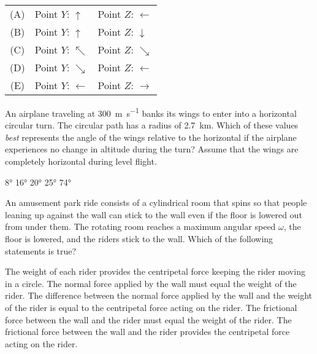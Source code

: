 \documentclass{../../oss-apphys-exam}
\begin{document}
\begin{multicols*}{2}
\begin{questions}
    \begin{tabular}{cll}
      (A) & Point $Y$: {\LARGE $\uparrow$} & Point $Z$: {\LARGE $\leftarrow$}\\
      (B) & Point $Y$: {\LARGE $\uparrow$} & Point $Z$: {\LARGE $\downarrow$}\\
      (C) & Point $Y$: {\LARGE $\nwarrow$} & Point $Z$: {\LARGE $\searrow$}\\
      (D) & Point $Y$: {\LARGE $\searrow$} & Point $Z$: {\LARGE $\leftarrow$}\\
      (E) & Point $Y$: {\LARGE $\leftarrow$}&Point $Z$: {\LARGE $\rightarrow$}\\
    \end{tabular}
    \columnbreak

    \columnbreak
    
    \question An airplane traveling at \SI{300}{\metre\per\second} banks its
    wings to enter into a horizontal circular turn. The circular path has a
    radius of \SI{2.7}{\kilo\metre}. Which of these values \emph{best}
    represents the angle of the wings relative to the horizontal if the airplane
    experiences no change in altitude during the turn? Assume that the wings
    are completely horizontal during level flight.
    \begin{choices}
      \choice\ang{8}
      \choice\ang{16}
      \choice\ang{20}
      \choice\ang{25}
      \correctchoice\ang{74}
    \end{choices}
    
    
    \question An amusement park ride consists of a cylindrical room that spins
    so that people leaning up against the wall can stick to the wall even if the
    floor is lowered out from under them. The rotating room reaches a maximum
    angular speed $\omega$, the floor is lowered, and the riders stick to
    the wall. Which of the following statements is true?
    \begin{choices}
      \choice The weight of each rider provides the centripetal force keeping
      the rider moving in a circle.
      \choice The normal force applied by the wall must equal the weight of the
      rider.
      \choice The difference between the normal force applied by the wall and
      the weight of the rider is equal to the centripetal force acting on the
      rider.
      \choice The frictional force between the wall and the rider must equal the
      weight of the rider.
      \choice The frictional force between the wall and the rider provides the
      centripetal force acting on the rider.
    \end{choices}


\end{questions}
\end{multicols*}
\end{document}
